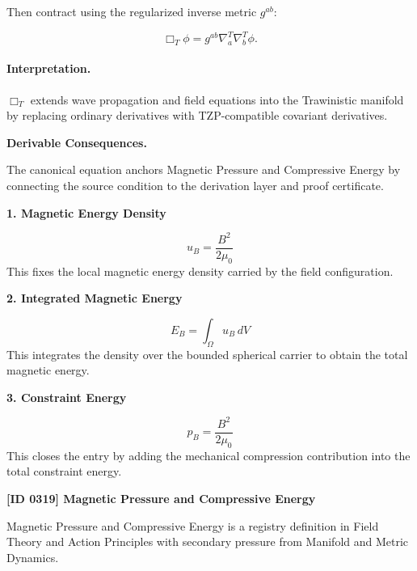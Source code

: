 Then contract using the regularized inverse metric $g^{ab}$:

\begin{equation}
\Box_T\phi
=
g^{ab}
\nabla^{T}_{a}
\nabla^{T}_{b}
\phi .
\end{equation}

\paragraph{Interpretation.}
$\Box_T$ extends wave propagation and field equations into the Trawinistic manifold by replacing ordinary derivatives with TZP-compatible covariant derivatives.

\par\vspace{0.35em}
\noindent\textbf{Derivable Consequences.}\quad
\begingroup
\footnotesize
\raggedright
The canonical equation anchors Magnetic Pressure and Compressive Energy by connecting the source condition to the derivation layer and proof certificate.
\par\endgroup

\noindent\textbf{1. Magnetic Energy Density}\par
\[
u_{B}=\frac{B^{2}}{2\mu_{0}}
\]
\noindent This fixes the local magnetic energy density carried by the field configuration.\par
\noindent\textbf{2. Integrated Magnetic Energy}\par
\[
E_{B}=\int_{\Omega}u_{B}\,dV
\]
\noindent This integrates the density over the bounded spherical carrier to obtain the total magnetic energy.\par
\noindent\textbf{3. Constraint Energy}\par
\[
p_{B}=\frac{B^{2}}{2\mu_{0}}
\]
\noindent This closes the entry by adding the mechanical compression contribution into the total constraint energy.\par

\clearpage
\noindent\textbf{[ID 0319] Magnetic Pressure and Compressive Energy}\par
\vspace{0.35em}
\begingroup\small
{}
Magnetic Pressure and Compressive Energy is a registry definition in Field Theory and Action Principles with secondary pressure from Manifold and Metric Dynamics.

